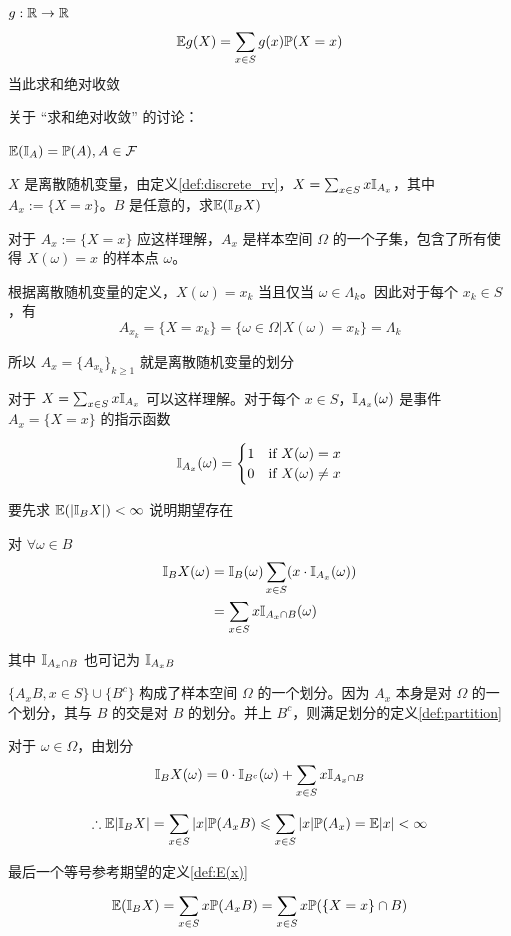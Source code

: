 \begin{definition}[$g(X)$的期望]
    $g:\mathbb{R}\rightarrow \mathbb{R}$
    \[
    \mathbb E g(X)=\sum_{x\in S}g(x)\mathbb{P}(X=x)
    \]
    当此求和绝对收敛
\end{definition}

关于 “求和绝对收敛” 的讨论：

\begin{example}
    $\mathbb E(\mathbb I_A)=\mathbb{P}(A), A\in \mathcal{F}$
\end{example}

\begin{example}\label{exa:expec_of_indica}
    $X$ 是离散随机变量，由定义\ref{def:discrete_rv}，$X=\sum_{x\in S}x\mathbb I_{A_x}$，其中 $A_x:=\{X=x\}$。$B$ 是任意的，求$\mathbb E(\mathbb I_B X)$
\end{example}

\begin{remark}
对于 $A_x:=\{X=x\}$ 应这样理解，$A_x$ 是样本空间 $\Omega$ 的一个子集，包含了所有使得 $X(\omega)=x$ 的样本点 $\omega$。

根据离散随机变量的定义，$X(\omega)=x_k$ 当且仅当 $\omega\in \Lambda_k$。因此对于每个 $x_k\in S$，有
\[
A_{x_k}=\{X=x_k\}=\{\omega\in \Omega|X(\omega)=x_k\}=\Lambda_k
\]

所以 $A_x=\{A_{x_k}\}_{k\geq 1}$ 就是离散随机变量的划分

对于 $X=\sum_{x\in S}x\mathbb I_{A_x}$ 可以这样理解。对于每个 $x\in S$，$\mathbb I_{A_x}(\omega)$ 是事件 $A_x=\{X=x\}$ 的指示函数

\[
    \mathbb I_{A_x}(\omega)=\begin{cases}
        1 & \text{if } X(\omega)=x\\
        0 & \text{if } X(\omega)\neq x
    \end{cases}
\]
\end{remark}

\begin{solution*}
要先求 $\mathbb E(|\mathbb I_B X|)<\infty$ 说明期望存在

对 $\forall \omega\in B$
\[
\begin{aligned}
    \mathbb I_B X(\omega)&=\mathbb I_B(\omega)\sum_{x\in S}(x\cdot \mathbb I_{A_x}(\omega))\\
    &=\sum_{x\in S}x\mathbb I_{A_x\cap B}(\omega)
\end{aligned}
\]

其中 $\mathbb I_{A_x\cap B}$ 也可记为 $\mathbb I_{A_x B}$

$\{A_x B,x\in S\}\cup \{B^c\}$ 构成了样本空间 $\Omega$ 的一个划分。因为 $A_x$ 本身是对 $\Omega$ 的一个划分，其与 $B$ 的交是对 $B$ 的划分。并上 $B^c$，则满足划分的定义\ref{def:partition}

对于 $\omega\in \Omega$，由划分
\[
\mathbb I_B X(\omega)=0\cdot \mathbb I_{B^c}(\omega)+\sum_{x\in S}x\mathbb I_{A_x\cap B}
\]

\[
\therefore \mathbb E |\mathbb I_B X|=\sum_{x\in S}|x|\mathbb{P}(A_x B)\leqslant \sum_{x\in S}|x|\mathbb{P}(A_x)=\mathbb E|x|<\infty
\]

最后一个等号参考期望的定义\ref{def:E(x)}

\[
\mathbb E (\mathbb I_B X)=\sum_{x\in S}x \mathbb{P}(A_x B)=\sum_{x\in S}x \mathbb{P}(\{X=x\}\cap B)
\]
\end{solution*}

